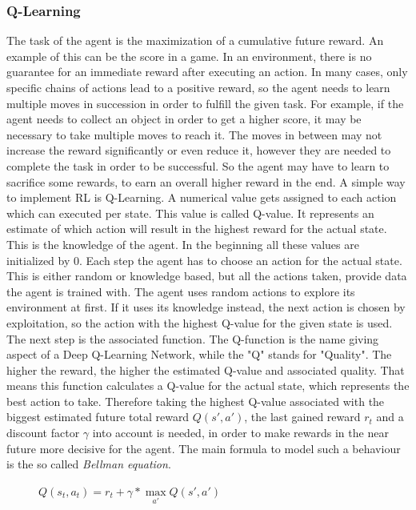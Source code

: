 	\subsubsection{Q-Learning}
		The task of the agent is the maximization of a cumulative future reward.
		An example of this can be the score in a game.
		In an environment, there is no guarantee for an immediate reward after executing an action.
		In many cases, only specific chains of actions lead to a positive reward, so the agent needs to learn multiple moves in succession in order to fulfill the given task.
		For example, if the agent needs to collect an object in order to get a higher score, it may be necessary to take multiple moves to reach it.
		The moves in between may not increase the reward significantly or even reduce it, however they are needed to complete the task in order to be successful.
		So the agent may have to learn to sacrifice some rewards, to earn an overall higher reward in the end.
		A simple way to implement RL is Q-Learning. A numerical value gets assigned to each action which can executed per state.
		This value is called Q-value.
		It represents an estimate of which action will result in the highest reward for the actual state.
		This is the knowledge of the agent.
		In the beginning all these values are initialized by 0.
		Each step the agent has to choose an action for the actual state.
		This is either random or knowledge based, but all the actions taken, provide data the agent is trained with.
		The agent uses random actions to explore its environment at first.
		If it uses its knowledge instead, the next action is chosen by exploitation, so the action with the highest Q-value for the given state is used.
		The next step is the associated function.
		The Q-function is the name giving aspect of a Deep Q-Learning Network, while the "Q" stands for "Quality".
		The higher the reward, the higher the estimated Q-value and associated quality.
		That means this function calculates a Q-value for the actual state, which represents the best action to take.
		Therefore taking the highest Q-value associated with the biggest estimated future total reward $Q(s', a')$, the last gained reward $r_t$ and a discount factor $\gamma$ into account is needed, in order to make rewards in the near future more decisive for the agent.
		The main formula to model such a behaviour is the so called \textit{Bellman equation}.
		
		\begin{figure}[h!]
			\begin{center}
				$Q(s_t, a_t) = r_t + \gamma * \max\limits_{a'} Q(s', a')$
			\end{center}
		\end{figure}